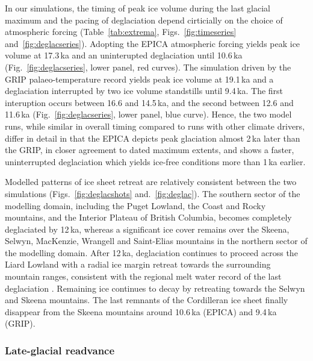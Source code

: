 \documentclass[tc, manuscript]{copernicus}
\begin{document}
In our simulations, the timing of peak ice volume during the last glacial
maximum and the pacing of deglaciation depend cirticially on the choice of
atmospheric forcing (Table~\ref{tab:extrema}, Figs.~\ref{fig:timeseries}
and~\ref{fig:deglacseries}). Adopting the EPICA
atmospheric forcing yields peak ice volume at 17.3\,ka and an uninterupted
deglaciation until 10.6\,ka (Fig.~\ref{fig:deglacseries}, lower panel, red
curves). The simulation driven by the GRIP palaeo-temperature record yields
peak ice volume at 19.1\,ka and a deglaciation interrupted by two ice volume
standstills until 9.4\,ka. The first interuption occurs between 16.6 and
14.5\,ka, and the second between 12.6 and 11.6\,ka
(Fig.~\ref{fig:deglacseries}, lower panel, blue curve). Hence, the two model
runs, while similar in overall timing compared to runs with other climate
drivers, differ in detail in that the EPICA depicts peak glaciation almost
2\,ka later than the GRIP, in closer agreement to dated maximum extents, and
shows a faster, uninterrupted deglaciation which yields ice-free conditions
more than 1\,ka earlier.

Modelled patterns of ice sheet retreat are relatively consistent between the
two simulations (Figs.~\ref{fig:deglacshots} and.~\ref{fig:deglac}). The
southern sector of the modelling domain, including the Puget Lowland, the Coast
and Rocky mountains, and the Interior Plateau of British Columbia, becomes
completely deglaciated by 12\,ka, whereas a significant ice cover remains over
the Skeena, Selwyn, MacKenzie, Wrangell and Saint-Elias mountains in the
northern sector of the modelling domain. After 12\,ka, deglaciation continues
to proceed across the Liard Lowland with a radial ice margin retreat towards
the surrounding mountain ranges, consistent with the regional melt water record
of the last deglaciation \citep{Margold.etal.2013}. Remaining ice continues to
decay by retreating towards the Selwyn and Skeena mountains. The last remnants
of the Cordilleran ice sheet finally disappear from the Skeena mountains around
10.6\,ka (EPICA) and 9.4\,ka (GRIP).


\subsubsection{Late-glacial readvance}
\end{document}
